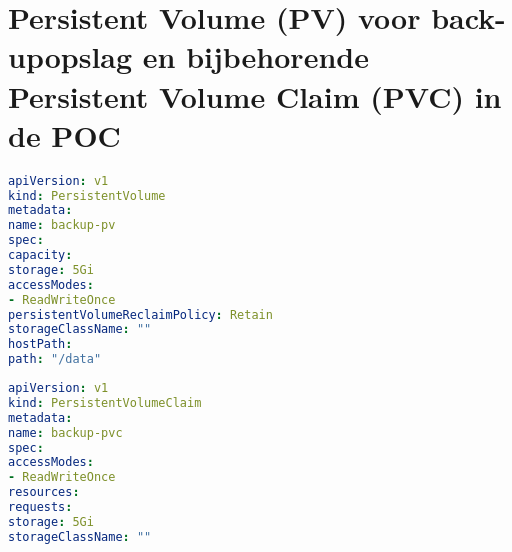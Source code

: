 \chapter{Persistent Volume (PV) voor back-upopslag en bijbehorende Persistent Volume Claim (PVC) in de POC}
\label{sec:pv}
\begin{lstlisting}[language=YAML, caption={YAML-bestand voor de configuratie van het Persistent Volume (PV) dat opslag biedt voor de databaseback-ups in Kubernetes.}]
apiVersion: v1
kind: PersistentVolume
metadata:
name: backup-pv
spec:
capacity:
storage: 5Gi
accessModes:
- ReadWriteOnce
persistentVolumeReclaimPolicy: Retain
storageClassName: ""  
hostPath:
path: "/data"  
\end{lstlisting}

\begin{lstlisting}[language=YAML, caption={YAML-bestand voor de configuratie van de Persistent Volume Claim (PVC).}]
apiVersion: v1
kind: PersistentVolumeClaim
metadata:
name: backup-pvc
spec:
accessModes:
- ReadWriteOnce
resources:
requests:
storage: 5Gi
storageClassName: ""
\end{lstlisting}